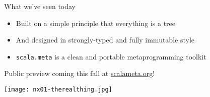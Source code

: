 \documentclass[svgnames,dvipsnames,hyperref={bookmarks=false},usepdftitle=false]{beamer}
\begin{document}
\begin{frame}{What we've seen today}
\begin{itemize}
\item Built on a simple principle that everything is a tree
\item And designed in strongly-typed and fully immutable style
\item \texttt{scala.meta} is a clean and portable metaprogramming toolkit
\end{itemize}
\end{frame}

\begin{frame}[c, fragile]{Public preview coming this fall at \href{http://scalameta.org/}{scalameta.org}!}
\begin{center}
\texttt{[image: nx01-therealthing.jpg]}\\
\end{center}
\end{frame}
\end{document}
